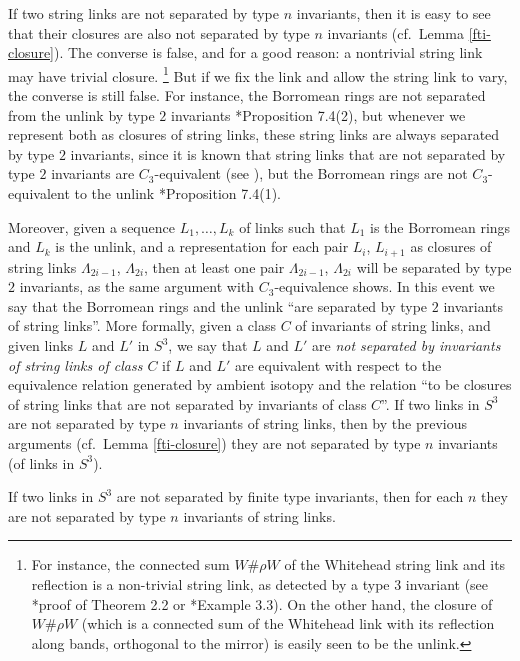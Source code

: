 \documentclass[a4paper,12pt,reqno,oneside]{amsart} %
\theoremstyle{plain}
\newenvironment{cj}[1]
  {\renewcommand\theinnercj{#1}\innercj}
  {\endinnercj}
\theoremstyle{definition}
\theoremstyle{named}
\renewcommand{\:}{\colon}
\begin{document}
If two string links are not separated by type $n$ invariants, then it is easy to see that their closures are also 
not separated by type $n$ invariants (cf.\ Lemma \ref{fti-closure}).
The converse is false, and for a good reason: a nontrivial string link may have trivial closure.%
\footnote{For instance, the connected sum $W\#\rho W$ of the Whitehead string link and its reflection is a non-trivial 
string link, as detected by a type $3$ invariant (see \cite{MR1}*{proof of Theorem 2.2} or \cite{M18}*{Example 3.3}).
On the other hand, the closure of $W\#\rho W$ (which is a connected sum of the Whitehead link with its reflection along bands, 
orthogonal to the mirror) is easily seen to be the unlink.}
But if we fix the link and allow the string link to vary, the converse is still false.
For instance, the Borromean rings are not separated from the unlink by type $2$ invariants \cite{Hab}*{Proposition 7.4(2)}, 
but whenever we represent both as closures of string links, these string links are always separated by type $2$ invariants, 
since it is known that string links that are not separated by type $2$ invariants are $C_3$-equivalent (see \cite{MY}), 
but the Borromean rings are not $C_3$-equivalent to the unlink \cite{Hab}*{Proposition 7.4(1)}.

Moreover, given a sequence $L_1,\dots,L_k$ of links such that $L_1$ is the Borromean rings and $L_k$ is the unlink, 
and a representation for each pair $L_i$, $L_{i+1}$ as closures of string links $\Lambda_{2i-1}$, $\Lambda_{2i}$,
then at least one pair $\Lambda_{2i-1}$, $\Lambda_{2i}$ will be separated by type $2$ invariants, as the same argument with 
$C_3$-equivalence shows.
In this event we say that the Borromean rings and the unlink ``are separated by type $2$ invariants of string links''.
More formally, given a class $C$ of invariants of string links, and given links $L$ and $L'$ in $S^3$, we say that $L$ and $L'$ 
are {\it not separated by invariants of string links of class $C$} if $L$ and $L'$ are equivalent with respect to the equivalence 
relation generated by ambient isotopy and the relation ``to be closures of string links that are not separated by invariants 
of class $C$''.
If two links in $S^3$ are not separated by type $n$ invariants of string links, then by the previous arguments 
(cf.\ Lemma \ref{fti-closure}) they are not separated by type $n$ invariants (of links in $S^3$).

\begin{cj}{(HM)} \label{habegger-meilhan} If two links in $S^3$ are not separated by finite type invariants, then 
for each $n$ they are not separated by type $n$ invariants of string links.
\end{cj}
\end{document}
